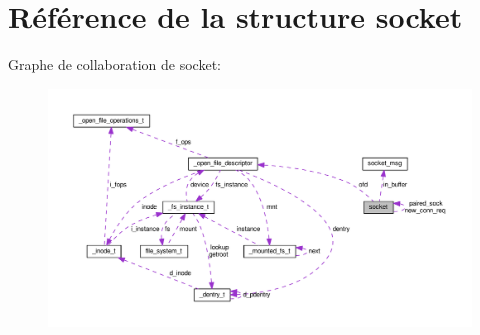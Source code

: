 \hypertarget{structsocket}{\section{Référence de la structure socket}
\label{structsocket}
}


Graphe de collaboration de socket\+:
\nopagebreak
\begin{figure}[H]
\begin{center}
\leavevmode
\includegraphics[width=350pt]{structsocket__coll__graph}
\end{center}
\end{figure}
